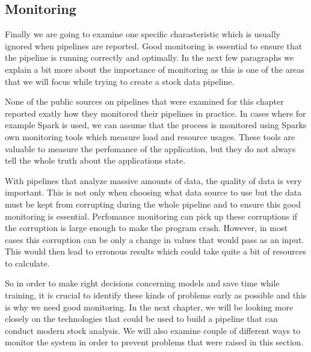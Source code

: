 \subsection{Monitoring}

Finally we are going to examine one specific charasteristic which is usually ignored when pipelines are reported.
Good monitoring is essential to ensure that the pipeline is running correctly and optimally.
In the next few paragraphs we explain a bit more about the importance of monitoring as this is one of the areas that we will focus while trying to create a stock data pipeline.

None of the public sources on pipelines that were examined for this chapter reported exatly how they monitored their pipelines in practice.
In cases where for example Spark is used, we can assume that the process is monitored using Sparks own monitoring tools which measure load and resource usages.
These tools are valuable to measure the perfomance of the application, but they do not always tell the whole truth about the applications state.

With pipelines that analyze massive amounts of data, the quality of data is very important.
This is not only when choosing what data source to use but the data must be kept from corrupting during the whole pipeline and to ensure this good monitoring is essential.
Perfomance monitoring can pick up these corruptions if the corruption is large enough to make the program crash.
However, in most cases this corruption can be only a change in values that would pass as an input.
This would then lead to erronous results which could take quite a bit of resources to calculate.

So in order to make right decisions concerning models and save time while training, it is crucial to identify these kinds of problems early as possible and this is why we need good monitoring.
In the next chapter, we will be looking more closely on the technologies that could be used to build a pipeline that can conduct modern stock analysis.
We will also examine couple of different ways to monitor the system in order to prevent problems that were raised in this section.
